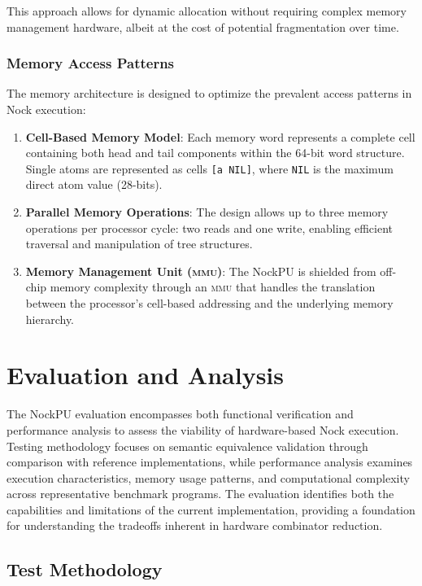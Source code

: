 \documentclass[twoside]{article}
\begin{document}
This approach allows for dynamic allocation without requiring complex memory management hardware, albeit at the cost of potential fragmentation over time.

\subsubsection{Memory Access Patterns}

The memory architecture is designed to optimize the prevalent access patterns in Nock execution:

\begin{enumerate}
  \item \textbf{Cell-Based Memory Model}: Each memory word represents a complete cell containing both head and tail components within the 64-bit word structure. Single atoms are represented as cells \texttt{[a NIL]}, where \texttt{NIL} is the maximum direct atom value (28-bits).
  \item \textbf{Parallel Memory Operations}: The design allows up to three memory operations per processor cycle: two reads and one write, enabling efficient traversal and manipulation of tree structures.
  \item \textbf{Memory Management Unit (\textsc{mmu})}: The NockPU is shielded from off-chip memory complexity through an \textsc{mmu} that handles the translation between the processor's cell-based addressing and the underlying memory hierarchy.
\end{enumerate}

\section{Evaluation and Analysis}

The NockPU evaluation encompasses both functional verification and performance analysis to assess the viability of hardware-based Nock execution. Testing methodology focuses on semantic equivalence validation through comparison with reference implementations, while performance analysis examines execution characteristics, memory usage patterns, and computational complexity across representative benchmark programs. The evaluation identifies both the capabilities and limitations of the current implementation, providing a foundation for understanding the tradeoffs inherent in hardware combinator reduction.

\subsection{Test Methodology}
\end{document}
